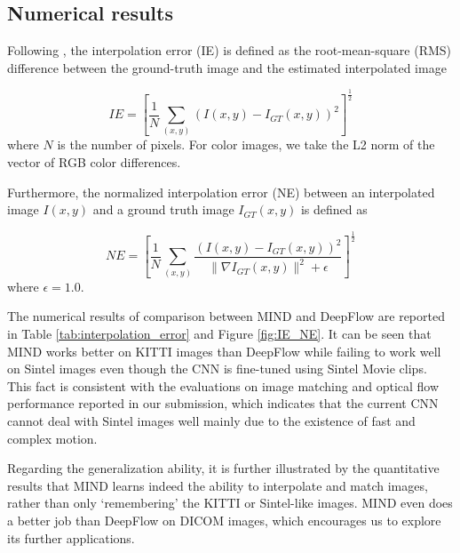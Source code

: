 \documentclass[runningheads]{llncs}
\begin{document}
	\vspace{+0.5cm}
	\subsection{Numerical results}
	Following \cite{baker2011database}, the interpolation error (IE) is defined as the root-mean-square (RMS) difference between the ground-truth image and the estimated interpolated image
	
	\begin{equation}
	IE = \left[\frac{1}{N}\sum_{\left(x, y\right)} \left(I(x, y)-I_{GT}(x, y)\right)^2\right]^{\frac{1}{2}}
	\end{equation}	
	where $N$ is the number of pixels. For color images, we take the L2 norm of the vector of RGB color differences.
	
	Furthermore, the normalized interpolation error (NE) between an interpolated image $I(x, y)$ and a ground truth image $I_{GT}(x, y)$ is defined as
	
	\begin{equation}
	NE = \left[\frac{1}{N}\sum_{\left(x, y\right)}\frac{\left(I(x, y)-I_{GT}(x, y)\right)^{2}}{\|\nabla I_{GT}(x, y)\|^{2}+\epsilon}\right]^{\frac{1}{2}}
        \end{equation}
	where $\epsilon=1.0$.

	The numerical results of comparison between MIND and DeepFlow are reported in Table \ref{tab:interpolation_error} and Figure \ref{fig:IE_NE}. It can be seen that MIND works better on KITTI images than DeepFlow while failing to work well on Sintel images even though the CNN is fine-tuned using Sintel Movie clips. This fact is consistent with the evaluations on image matching and optical flow performance reported in our submission, which indicates that the current CNN cannot deal with Sintel images well mainly due to the existence of fast and complex motion.
	
	Regarding the generalization ability, it is further illustrated by the quantitative results that MIND learns indeed the ability to interpolate and match images, rather than only `remembering' the KITTI or Sintel-like images. MIND even does a better job than DeepFlow on DICOM images, which encourages us to explore its further applications. 
\end{document}
